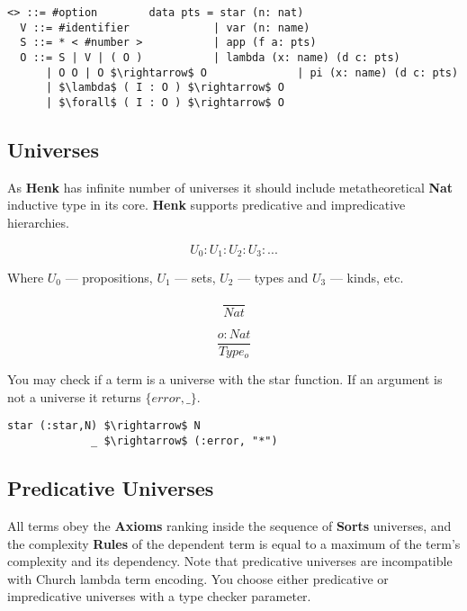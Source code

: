 \documentclass{article}
\begin{document}
\begin{lstlisting}[mathescape=true]
 <> ::= #option        data pts = star (n: nat)
  V ::= #identifier             | var (n: name)
  S ::= * < #number >           | app (f a: pts)
  O ::= S | V | ( O )           | lambda (x: name) (d c: pts)
      | O O | O $\rightarrow$ O              | pi (x: name) (d c: pts)
      | $\lambda$ ( I : O ) $\rightarrow$ O
      | $\forall$ ( I : O ) $\rightarrow$ O
\end{lstlisting}

\subsection{Universes}

As {\bf Henk} has infinite number of universes it should include metatheoretical {\bf Nat} inductive type in its core.
{\bf Henk} supports predicative and impredicative hierarchies.

$$
U_0 : U_1 : U_2 : U_3 : ...
$$

Where $U_0$ --- propositions, $U_1$ --- sets, $U_2$ --- types and $U_3$ --- kinds, etc.

\begin{equation}
\tag{I}
\dfrac
{}
{Nat}
\end{equation}

\begin{equation}
\tag{S}
\dfrac
{o : Nat}
{Type_o}
\end{equation}

You may check if a term is a universe with the star function.
If an argument is not a universe it returns $\{error,\_\}$.

\begin{lstlisting}[mathescape=true]
star (:star,N) $\rightarrow$ N
             _ $\rightarrow$ (:error, "*")
\end{lstlisting}

\subsection{Predicative Universes}

All terms obey the {\bf Axioms} ranking inside the sequence of {\bf Sorts} universes, and the complexity {\bf Rules} of the dependent term is equal to a maximum of the term's complexity and its dependency.
Note that predicative universes are incompatible with Church lambda term encoding.
You choose either predicative or impredicative universes with a type checker parameter.
\end{document}
